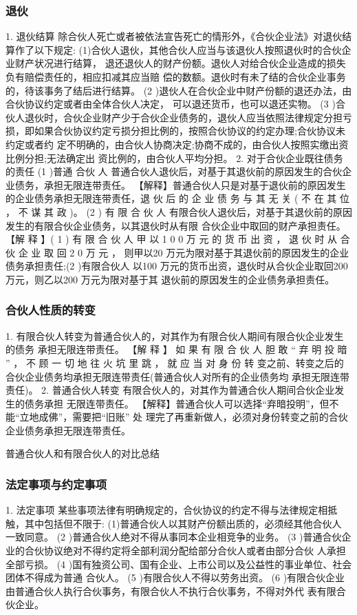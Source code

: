 \documentclass[UTF8,12pt]{ctexart}
\numberwithin{equation}{section} %
\numberwithin{figure}{section}
\numberwithin{table}{section}
\begin{document}
	\subsubsection{退伙}
	1. 退伙结算 除合伙人死亡或者被依法宣告死亡的情形外，《合伙企业法》对退伙结算作了以下规定: (1)合伙人退伙，其他合伙人应当与该退伙人按照退伙时的合伙企业财产状况进行结算， 退还退伙人的财产份额。退伙人对给合伙企业造成的损失负有赔偿责任的，相应扣减其应当赔 偿的数额。退伙时有未了结的合伙企业事务的，待该事务了结后进行结算。
	(2 )退伙人在合伙企业中财产份额的退还办法，由合伙协议约定或者由全体合伙人决定， 可以退还货币，也可以退还实物。
	(3 )合伙人退伙时，合伙企业财产少于合伙企业债务的，退伙人应当依照法律规定分担亏 损，即如果合伙协议约定亏损分担比例的，按照合伙协议的约定办理;合伙协议未约定或者约 定不明确的，由合伙人协商决定;协商不成的，由合伙人按照实缴出资比例分担;无法确定出 资比例的，由合伙人平均分担。
	2. 对于合伙企业既往债务的责任
	(1 )普通 合伙 人 普通合伙人退伙后，对基于其退伙前的原因发生的合伙企业债务，承担无限连带责任。
	【解释】普通合伙人只是对基于退伙前的原因发生的企业债务承担无限连带责任，退 伙 后 的 企 业 债 务 与 其 无 关 ( 不 在 其 位 ， 不 谋 其 政 )。
	(2 ) 有 限 合 伙 人 有限合伙人退伙后，对基于其退伙前的原因发生的有限合伙企业债务，以其退伙时从有限 合伙企业中取回的财产承担责任。
	【解 释 】( 1 ) 有 限 合 伙 人 甲 以 1 0 0 万 元 的 货 币 出 资 ， 退 伙 时 从 合 伙 企 业 取 回 2 0 万 元 ， 则甲以20 万元为限对基于其退伙前的原因发生的企业债务承担责任;(2 )有限合伙人 以100 万元的货币出资，退伙时从合伙企业取回200 万元，则乙以200 万元为限对基于其 退伙前的原因发生的企业债务承担责任。
	
	
	\subsubsection{合伙人性质的转变}
	
	1. 有限合伙人转变为普通合伙人的，对其作为有限合伙人期间有限合伙企业发生的债务 承担无限连带责任。
	【解 释 】 如 果 有 限 合 伙 人 胆 敢 “ 弃 明 投 暗 ” ， 不 顾 一 切 地 往 火 坑 里 跳 ， 就 应 当 对 身 份 转 变之前、转变之后的合伙企业债务均承担无限连带责任(普通合伙人对所有的企业债务均 承担无限连带责任)。
	2. 普通合伙人转变 有限合伙人的，对其作为普通合伙人期间合伙企业发生的债务承担 无限连带责任。
	【解释】普通合伙人可以选择“弃暗投明”，但不能“立地成佛”，需要把“旧账” 处 理完了再重新做人，必须对身份转变之前的合伙企业债务承担无限连带责任。
	
	普通合伙人和有限合伙人的对比总结
	\subsubsection{法定事项与约定事项}
	1. 法定事项 某些事项法律有明确规定的，合伙协议的约定不得与法律规定相抵触，其中包括但不限于: (1)普通合伙人以其财产份额出质的，必须经其他合伙人 一致同意。
	(2 )普通合伙人绝对不得从事同本企业相竞争的业务。
	(3 )普通合伙企业的合伙协议绝对不得约定将全部利润分配给部分合伙人或者由部分合伙 人承担全部亏损。
	(4 )国有独资公司、国有企业、上市公司以及公益性的事业单位、社会团体不得成为普通 合伙人。
	(5 )有限合伙人不得以劳务出资。
	(6 )有限合伙企业由普通合伙人执行合伙事务，有限合伙人不执行合伙事务，不得对外代 表有限合伙企业。
	
\end{document}
